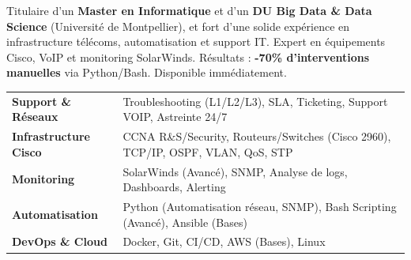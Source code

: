 \documentclass[11pt,a4paper]{article}
\begin{document}

Titulaire d'un \textbf{Master en Informatique} et d'un \textbf{DU Big Data \& Data Science} (Université de Montpellier), et fort d'une solide expérience en infrastructure télécoms, automatisation et support IT. Expert en équipements Cisco, VoIP et monitoring SolarWinds. Résultats : \textbf{-70\% d'interventions manuelles} via Python/Bash. Disponible immédiatement.

\noindent
\begin{tabularx}{\linewidth}{@{} p{3.5cm} X @{}}
\textbf{Support \& Réseaux} & Troubleshooting (L1/L2/L3), SLA, Ticketing, Support VOIP, Astreinte 24/7 \\
\textbf{Infrastructure Cisco} & CCNA R\&S/Security, Routeurs/Switches (Cisco 2960), TCP/IP, OSPF, VLAN, QoS, STP \\
\textbf{Monitoring} & SolarWinds (Avancé), SNMP, Analyse de logs, Dashboards, Alerting \\
\textbf{Automatisation} & Python (Automatisation réseau, SNMP), Bash Scripting (Avancé), Ansible (Bases) \\
\textbf{DevOps \& Cloud} & Docker, Git, CI/CD, AWS (Bases), Linux \\
\end{tabularx}
\end{document}
